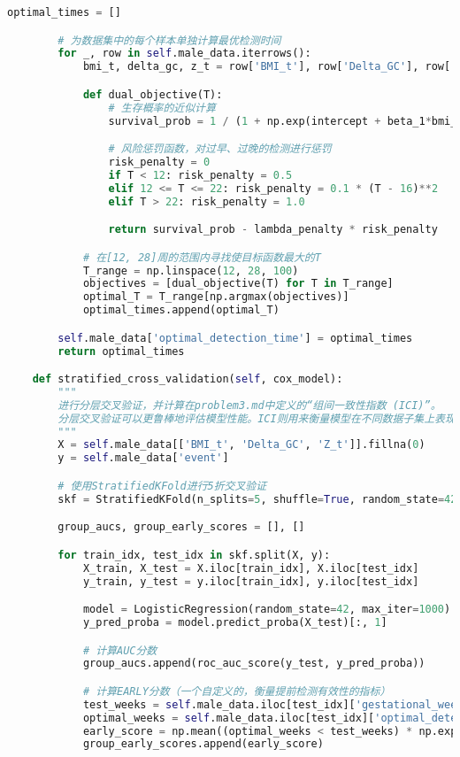 \documentclass[UTF8, a4paper, 11pt]{ctexart}
\begin{document}
\begin{lstlisting}[language=Python, caption={问题三的解决方案脚本。}]
        optimal_times = []

        # 为数据集中的每个样本单独计算最优检测时间
        for _, row in self.male_data.iterrows():
            bmi_t, delta_gc, z_t = row['BMI_t'], row['Delta_GC'], row['Z_t']

            def dual_objective(T):
                # 生存概率的近似计算
                survival_prob = 1 / (1 + np.exp(intercept + beta_1*bmi_t + beta_2*delta_gc + beta_3*z_t))

                # 风险惩罚函数，对过早、过晚的检测进行惩罚
                risk_penalty = 0
                if T < 12: risk_penalty = 0.5
                elif 12 <= T <= 22: risk_penalty = 0.1 * (T - 16)**2
                elif T > 22: risk_penalty = 1.0

                return survival_prob - lambda_penalty * risk_penalty

            # 在[12, 28]周的范围内寻找使目标函数最大的T
            T_range = np.linspace(12, 28, 100)
            objectives = [dual_objective(T) for T in T_range]
            optimal_T = T_range[np.argmax(objectives)]
            optimal_times.append(optimal_T)

        self.male_data['optimal_detection_time'] = optimal_times
        return optimal_times

    def stratified_cross_validation(self, cox_model):
        """
        进行分层交叉验证，并计算在problem3.md中定义的“组间一致性指数 (ICI)”。
        分层交叉验证可以更鲁棒地评估模型性能。ICI则用来衡量模型在不同数据子集上表现得是否一致。
        """
        X = self.male_data[['BMI_t', 'Delta_GC', 'Z_t']].fillna(0)
        y = self.male_data['event']

        # 使用StratifiedKFold进行5折交叉验证
        skf = StratifiedKFold(n_splits=5, shuffle=True, random_state=42)

        group_aucs, group_early_scores = [], []

        for train_idx, test_idx in skf.split(X, y):
            X_train, X_test = X.iloc[train_idx], X.iloc[test_idx]
            y_train, y_test = y.iloc[train_idx], y.iloc[test_idx]

            model = LogisticRegression(random_state=42, max_iter=1000).fit(X_train, y_train)
            y_pred_proba = model.predict_proba(X_test)[:, 1]

            # 计算AUC分数
            group_aucs.append(roc_auc_score(y_test, y_pred_proba))

            # 计算EARLY分数（一个自定义的，衡量提前检测有效性的指标）
            test_weeks = self.male_data.iloc[test_idx]['gestational_week']
            optimal_weeks = self.male_data.iloc[test_idx]['optimal_detection_time']
            early_score = np.mean((optimal_weeks < test_weeks) * np.exp(-0.1 * (test_weeks - optimal_weeks)))
            group_early_scores.append(early_score)


\end{lstlisting}
\end{document}
